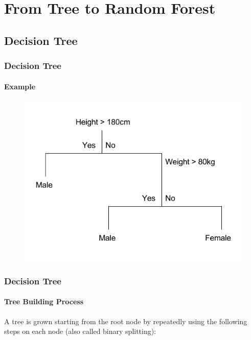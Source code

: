 \section{From Tree to Random Forest}
\subsection{Decision Tree}

\begin{frame}
	\frametitle{Decision Tree}
	\framesubtitle{Example}
	\begin{figure}		
		\includegraphics[height=0.7\textheight]{images/decision_tree_example.png}
	\end{figure}
\end{frame}

\begin{frame}
	\frametitle{Decision Tree}
	\framesubtitle{Tree Building Process}
	A tree is grown starting from the root node by repeatedly 
	using the following steps on each node (also called binary splitting)\cite{breiman1984classification}:
	\smallbreak
	\begin{enumerate}
	\end{enumerate}
\end{frame}	

